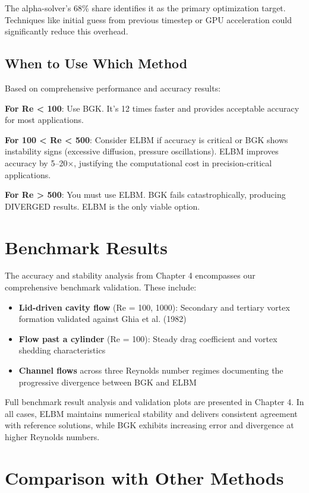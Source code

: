 The alpha-solver's 68\% share identifies it as the primary optimization target. Techniques like initial guess from previous timestep or GPU acceleration could significantly reduce this overhead.

\subsection{When to Use Which Method}

Based on comprehensive performance and accuracy results:

\textbf{For Re < 100}: Use BGK. It's 12 times faster and provides acceptable accuracy for most applications.

\textbf{For 100 < Re < 500}: Consider ELBM if accuracy is critical or BGK shows instability signs (excessive diffusion, pressure oscillations). ELBM improves accuracy by 5–20×, justifying the computational cost in precision-critical applications.

\textbf{For Re > 500}: You must use ELBM. BGK fails catastrophically, producing DIVERGED results. ELBM is the only viable option.

\section{Benchmark Results}

The accuracy and stability analysis from Chapter 4 encompasses our comprehensive benchmark validation. These include:

\begin{itemize}
    \item \textbf{Lid-driven cavity flow} (Re = 100, 1000): Secondary and tertiary vortex formation validated against Ghia et al. (1982)
    \item \textbf{Flow past a cylinder} (Re = 100): Steady drag coefficient and vortex shedding characteristics
    \item \textbf{Channel flows} across three Reynolds number regimes documenting the progressive divergence between BGK and ELBM
\end{itemize}

Full benchmark result analysis and validation plots are presented in Chapter 4. In all cases, ELBM maintains numerical stability and delivers consistent agreement with reference solutions, while BGK exhibits increasing error and divergence at higher Reynolds numbers.

\section{Comparison with Other Methods}

